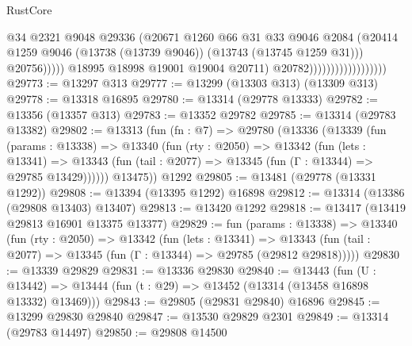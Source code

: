 \begin{lexlean}{RustCore}
\begin{coremodule}
                                                  @34
                                                  @2321
                                                  @9048
                                                  @29336
                                                  (@20671
                                                    @1260
                                                    @66
                                                    @31
                                                    @33
                                                    @9046
                                                    @2084
                                                    (@20414
                                                      @1259
                                                      @9046
                                                      (@13738 (@13739 @9046))
                                                      (@13743 (@13745 @1259 @31)))
                                                    @20756)))))
                                          @18995
                                          @18998
                                          @19001
                                          @19004
                                          @20711)
                                        @20782))))))))))))))))))
@29773 := @13297 @313
@29777 := @13299 (@13303 @313) (@13309 @313)
@29778 := @13318 @16895
@29780 := @13314 (@29778 @13333)
@29782 := @13356 (@13357 @313)
@29783 := @13352 @29782
@29785 := @13314 (@29783 @13382)
@29802 := @13313
    (fun (fn : @7) =>
    @29780
      (@13336
        (@13339
          (fun (params : @13338) =>
          @13340
            (fun (rty : @2050) =>
            @13342
              (fun (lets : @13341) =>
              @13343 (fun (tail : @2077) => @13345 (fun (Γ : @13344) => @29785 @13429))))))
        @13475))
    @1292
@29805 := @13481 (@29778 (@13331 @1292))
@29808 := @13394 (@13395 @1292) @16898
@29812 := @13314 (@13386 (@29808 @13403) @13407)
@29813 := @13420 @1292
@29818 := @13417 (@13419 @29813 @16901 @13375 @13377)
@29829 := fun (params : @13338) =>
  @13340
    (fun (rty : @2050) =>
    @13342
      (fun (lets : @13341) =>
      @13343 (fun (tail : @2077) => @13345 (fun (Γ : @13344) => @29785 (@29812 @29818)))))
@29830 := @13339 @29829
@29831 := @13336 @29830
@29840 := @13443
    (fun (U : @13442) => @13444 (fun (t : @29) => @13452 (@13314 (@13458 @16898 @13332) @13469)))
@29843 := @29805 (@29831 @29840) @16896
@29845 := @13299 @29830 @29840
@29847 := @13530 @29829 @2301
@29849 := @13314 (@29783 @14497)
@29850 := @29808 @14500

\end{coremodule}
\end{lexlean}
